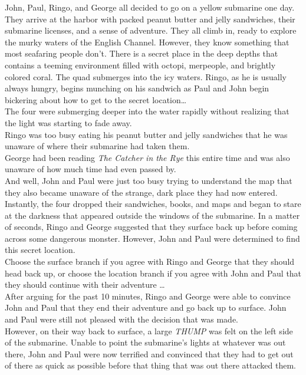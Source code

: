 \documentclass{article}
\begin{document}
John, Paul, Ringo, and George all decided to go on a yellow submarine one day.
They arrive at the harbor with packed peanut butter and jelly sandwiches,
their submarine licenses, and a sense of adventure.
They all climb in, ready to explore the murky waters of the English Channel.
However, they know something that most seafaring people don’t.
There is a secret place in the deep depths that contains a teeming environment
filled with octopi, merpeople, and brightly colored coral.
The quad submerges into the icy waters. Ringo, as he is usually always hungry,
begins munching on his sandwich as Paul and John begin bickering about how to
get to the secret location… \\

The four were submerging deeper into the water rapidly without realizing that
the light was starting to fade away.\\

Ringo was too busy eating his peanut butter and jelly sandwiches that he was
unaware of where their submarine had taken them.\\

George had been reading \textit{The Catcher in the Rye} this entire time and was
also unaware of how much time had even passed by.\\

And well, John and Paul were just too busy trying to understand the map that they
also became unaware of the strange, dark place they had now entered. \\

Instantly, the four dropped their sandwiches, books, and maps and began to stare
at the darkness that appeared outside the windows of the submarine. In a matter
of seconds, Ringo and George suggested that they surface back up before coming
across some dangerous monster. However, John and Paul were determined to find this
secret location.\\

Choose the surface branch if you agree with Ringo and George that they should
head back up, or choose the location branch if you agree with John and Paul that
they should continue with their adventure … \\

After arguing for the past 10 minutes, Ringo and George were able to convince
John and Paul that they end their adventure and go back up to surface. John and
Paul were still not pleased with the decision that was made.\\

However, on their way back to surface, a large \textit{THUMP} was felt on the
left side of the submarine. Unable to point the submarine’s lights at whatever
was out there, John and Paul were now terrified and convinced that they had to
get out of there as quick as possible before that thing that was out there attacked them.
\end{document}
